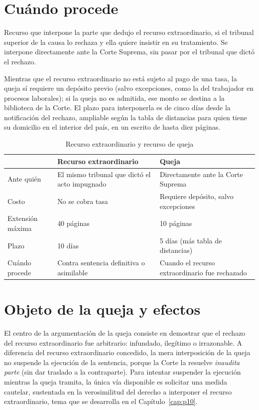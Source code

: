 \documentclass[12pt,oneside]{book}
\begin{document}
\section{Cuándo procede}

\begin{defbox}
Recurso que interpone la parte que dedujo el recurso extraordinario, si el
tribunal superior de la causa lo rechaza y ella quiere insistir en su
tratamiento. Se interpone directamente ante la Corte Suprema, sin pasar por el
tribunal que dictó el rechazo.
\end{defbox}

Mientras que el recurso extraordinario no está sujeto al pago de una tasa, la
queja sí requiere un depósito previo (salvo excepciones, como la del trabajador en
procesos laborales); si la queja no es admitida, ese monto se destina a la
biblioteca de la Corte. El plazo para interponerla es de cinco días desde la
notificación del rechazo, ampliable según la tabla de distancias para quien tiene
su domicilio en el interior del país, en un escrito de hasta diez páginas.

\begin{table}[H]
\centering
\caption{Recurso extraordinario y recurso de queja}
\begin{tabularx}{\textwidth}{@{}lXX@{}}
\toprule
& \textbf{Recurso extraordinario} & \textbf{Queja} \\
\midrule
Ante quién & El mismo tribunal que dictó el acto impugnado & Directamente ante la
Corte Suprema \\
Costo & No se cobra tasa & Requiere depósito, salvo excepciones \\
Extensión máxima & 40 páginas & 10 páginas \\
Plazo & 10 días & 5 días (más tabla de distancias) \\
Cuándo procede & Contra sentencia definitiva o asimilable & Cuando el recurso
extraordinario fue rechazado \\
\bottomrule
\end{tabularx}
\end{table}

\section{Objeto de la queja y efectos}

El centro de la argumentación de la queja consiste en demostrar que el rechazo del
recurso extraordinario fue arbitrario: infundado, ilegítimo o irrazonable. A
diferencia del recurso extraordinario concedido, la mera interposición de la
queja no suspende la ejecución de la sentencia, porque la Corte la resuelve
\textit{inaudita parte} (sin dar traslado a la contraparte). Para intentar
suspender la ejecución mientras la queja tramita, la única vía disponible es
solicitar una medida cautelar, sustentada en la verosimilitud del derecho a
interponer el recurso extraordinario, tema que se desarrolla en el
Capítulo~\ref{cap:p10}.
\end{document}
